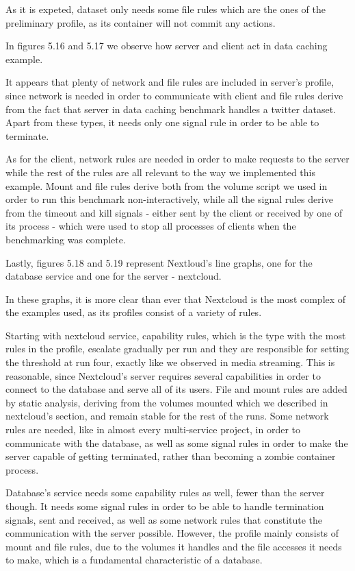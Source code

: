As it is expeted, dataset only needs some file rules which are the ones of the preliminary profile, as its container will not commit any actions.

In figures 5.16 and 5.17 we observe how server and client act in data caching example. 

It appears that plenty of network and file rules are included in server's profile, since network is needed in order to communicate with client and file rules derive from the fact that server in data caching benchmark handles a twitter dataset. Apart from these types, it needs only one signal rule in order to be able to terminate.

As for the client, network rules are needed in order to make requests to the server while the rest of the rules are all relevant to the way we implemented this example. Mount and file rules derive both from the volume script we used in order to run this benchmark non-interactively, while all the signal rules derive from the timeout and kill signals - either sent by the client or received by one of its process - which were used to stop all processes of clients when the benchmarking was complete.

Lastly, figures 5.18 and 5.19 represent Nextloud's line graphs, one for the database service and one for the server - nextcloud.

In these graphs, it is more clear than ever that Nextcloud is the most complex of the examples used, as its profiles consist of a variety of rules. 

Starting with nextcloud service, capability rules, which is the type with the most rules in the profile, escalate gradually per run and they are responsible for setting the threshold at run four, exactly like we observed in media streaming. This is reasonable, since Nextcloud's server requires several capabilities in order to connect to the database and serve all of its users.  File and mount rules are added by static analysis, deriving from the volumes mounted which we described in nextcloud's section, and remain stable for the rest of the runs. Some network rules are needed, like in almost every multi-service project, in order to communicate with the database, as well as some signal rules in order to make the server capable of getting terminated, rather than becoming a zombie container process.

Database's service needs some capability rules as well, fewer than the server though. It needs some signal rules in order to be able to handle termination signals, sent and received, as well as some network rules that constitute the communication with the server possible. However, the profile mainly consists of mount and file rules, due to the volumes it handles and the file accesses it needs to make, which is a fundamental characteristic of a database.
 
